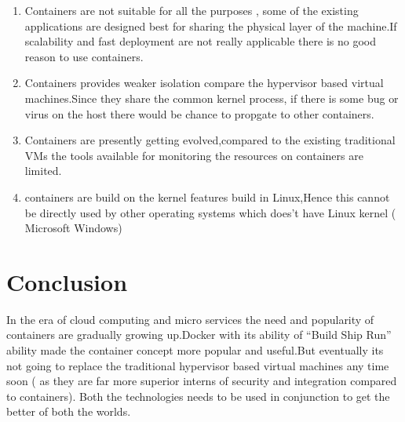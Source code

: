 \documentclass[9pt,twocolumn,twoside]{styles/osajnl}
\begin{document}
\begin{enumerate}
\item Containers are not suitable for all the purposes , some of the
  existing applications are designed best for sharing the physical
  layer of the machine.If scalability and fast deployment are not
  really applicable there is no good reason to use containers. \cite{www-search}  
\item Containers provides weaker isolation compare the hypervisor
  based virtual machines.Since they share the common kernel process,
  if there is some bug or virus on the host there would be chance to
  propgate to other containers. \cite{www-search}
\item Containers are presently getting evolved,compared to the
  existing traditional VMs the tools available for monitoring the
  resources on containers are limited. \cite{www-search}

\item containers are build on the kernel features build in Linux,Hence
  this cannot be directly used by other operating systems which does't
  have Linux kernel ( Microsoft Windows) 
\end{enumerate}

\section{Conclusion} 
In the era of cloud computing and micro services the need and
popularity of containers are gradually growing up.Docker with its
ability of “Build Ship Run” \cite{www-docker} ability made the container concept
more popular and useful.But eventually its not going to replace the
traditional hypervisor based virtual machines any time soon ( as they
are far more superior interns of security and integration compared to
containers). Both the technologies needs to be used in conjunction to
get the better of both the worlds. 



 
\newpage

\appendix
\end{document}
